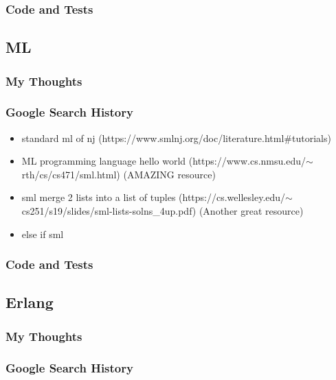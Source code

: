 \documentclass[letterpaper, 10pt, DIV=13]{scrartcl}
\numberwithin{equation}{section}
\numberwithin{figure}{section}
\numberwithin{table}{section}
\begin{document}
\subsubsection{Code and Tests}



\subsection{ML}
\subsubsection{My Thoughts}

\subsubsection{Google Search History}
\begin{itemize}
    \item standard ml of nj (https://www.smlnj.org/doc/literature.html\#tutorials)
    \item ML programming language hello world (https://www.cs.nmsu.edu/$\sim$rth/cs/cs471/sml.html) (AMAZING resource)
    \item sml merge 2 lists into a list of tuples (https://cs.wellesley.edu/$\sim$cs251/s19/slides/sml-lists-solns\_4up.pdf) (Another great resource)
    \item else if sml
\end{itemize}

\subsubsection{Code and Tests}



\subsection{Erlang}
\subsubsection{My Thoughts}

\subsubsection{Google Search History}
\end{document}
